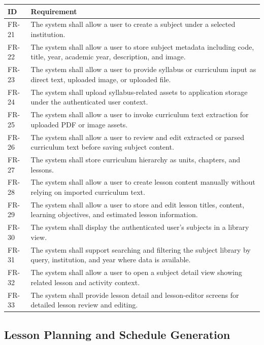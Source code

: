 \documentclass[12pt]{article}
\begin{document}
\begin{longtable}{|L{2.3cm}|L{11.3cm}|}
\hline
\textbf{ID} & \textbf{Requirement} \\
\hline
FR-21 & The system shall allow a user to create a subject under a selected institution. \\
\hline
FR-22 & The system shall allow a user to store subject metadata including code, title, year, academic year, description, and image. \\
\hline
FR-23 & The system shall allow a user to provide syllabus or curriculum input as direct text, uploaded image, or uploaded file. \\
\hline
FR-24 & The system shall upload syllabus-related assets to application storage under the authenticated user context. \\
\hline
FR-25 & The system shall allow a user to invoke curriculum text extraction for uploaded PDF or image assets. \\
\hline
FR-26 & The system shall allow a user to review and edit extracted or parsed curriculum text before saving subject content. \\
\hline
FR-27 & The system shall store curriculum hierarchy as units, chapters, and lessons. \\
\hline
FR-28 & The system shall allow a user to create lesson content manually without relying on imported curriculum text. \\
\hline
FR-29 & The system shall allow a user to store and edit lesson titles, content, learning objectives, and estimated lesson information. \\
\hline
FR-30 & The system shall display the authenticated user's subjects in a library view. \\
\hline
FR-31 & The system shall support searching and filtering the subject library by query, institution, and year where data is available. \\
\hline
FR-32 & The system shall allow a user to open a subject detail view showing related lesson and activity context. \\
\hline
FR-33 & The system shall provide lesson detail and lesson-editor screens for detailed lesson review and editing. \\
\hline
\end{longtable}

\subsection{Lesson Planning and Schedule Generation}
\end{document}
